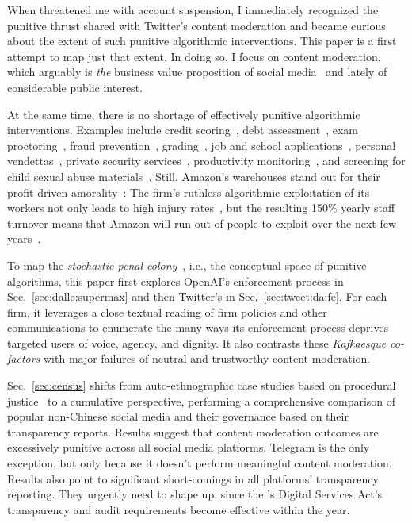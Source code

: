 When \DALLE{} threatened me with account suspension, I immediately recognized
the punitive thrust shared with Twitter's content moderation and became curious
about the extent of such punitive algorithmic interventions. This paper is a
first attempt to map just that extent. In doing so, I focus on content
moderation, which arguably is \emph{the} business value proposition of social
media~\cite{Masnick2022a,Patel2022a} and lately of considerable public interest.

At the same time, there is no shortage of effectively punitive algorithmic
interventions. Examples include credit scoring~\cite{Anonymous2018}, debt
assessment~\cite{Yampolskiy2015}, exam proctoring~\cite{FrancisWard2021b}, fraud
prevention~\cite{Kugel2022}, grading~\cite{Lam2020}, job and school
applications~\cite{Anonymous2016,Hall2012,Hall2020a,Stockton2020}, personal
vendettas~\cite{Casovan2022}, private security services~\cite{HaoSwart2022},
productivity
monitoring~\cite{Covert2022,HaoFreischlad2022,KantorSundaramea2022,Rosenblat2018},
and screening for child sexual abuse materials~\cite{Atherton2022a}. Still,
Amazon's warehouses stand out for their profit-driven
amorality~\cite{KantorWeiseea2021,Lennard2020}: The firm's ruthless algorithmic
exploitation of its workers not only leads to high injury
rates~\cite{Brown2019a,Clark2023,Sainato2021}, but the resulting 150\% yearly
staff turnover means that Amazon will run out of people to exploit over the next
few years~\cite{Sainato2022}.

To map the \emph{stochastic penal colony}~, i.e., the
conceptual space of punitive algorithms, this paper first explores OpenAI's
enforcement process in Sec.~\ref{sec:dalle:supermax} and then Twitter's in
Sec.~\ref{sec:tweet:da:fe}. For each firm, it leverages a close textual reading
of firm policies and other communications to enumerate the many ways its
enforcement process deprives targeted users of voice, agency, and dignity. It
also contrasts these \emph{Kafkaesque co-factors} with major failures of neutral
and trustworthy content moderation.

Sec.~\ref{sec:census} shifts from auto-ethnographic case studies based on
procedural justice~\cite{Tyler2003,Tyler2006,Tyler2007} to a cumulative
perspective, performing a comprehensive comparison of popular non-Chinese social
media and their governance based on their transparency reports. Results suggest
that content moderation outcomes are excessively punitive across all social
media platforms. Telegram is the only exception, but only because it doesn't
perform meaningful content moderation. Results also point to significant
short-comings in all platforms' transparency reporting. They urgently need to
shape up, since the \EU's Digital Services Act's transparency and audit
requirements become effective within the year.


